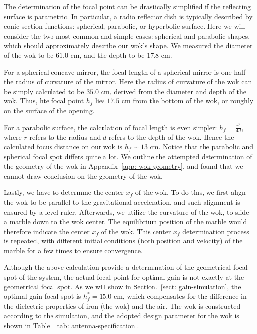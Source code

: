 \documentclass[12pt]{article}
\begin{document}
    The determination of the focal point can be drastically simplified if the reflecting surface is parametric. In particular, a radio reflector dish is typically described by conic section functions: spherical, parabolic, or hyperbolic surface. 
    Here we will consider the two most common and simple cases: spherical and parabolic shapes, which should approximately describe our wok's shape. We measured the diameter of the wok to be $61.0$ cm, and the depth to be $17.8$ cm.

    For a spherical concave mirror, the focal length of a spherical mirror is one-half the radius of curvature of the mirror. Here the radius of curvature of the wok can be simply calculated to be $35.0$ cm, derived from the diameter and depth of the wok. Thus, hte focal point $h_f$ lies $17.5$ cm from the bottom of the wok, or roughly on the surface of the opening.  

    For a parabolic surface, the calculation of focal length is even simpler: $h_{f} =\frac{r^2}{4d}$, where $r$ refers to the radius and $d$ refers to the depth of the wok.
    Hence the calculated focus distance on our wok is $h_f \sim 13$ cm. 
    Notice that the parabolic and spherical focal spot differs quite a lot.  
    We outline the attempted determination of the geometry of the wok in Appendix~\ref{app: wok-geometry}, and found that we cannot draw conclusion on the geometry of the wok. 

    Lastly, we have to determine the center $x_f$ of the wok. 
    To do this, we first align the wok to be parallel to the gravitational acceleration, 
    and such alignment is ensured by a level ruler.
    Afterwards, we utilize the curvature of the wok, to slide a marble down to the wok center.
    The equilibrium position of the marble would therefore indicate the center $x_f$ of the wok. 
    This center $x_f$ determination process is repeated, with different initial conditions (both position and velocity) of the marble for a few times to ensure convergence.

    Although the above calculation provide a determination of the geometrical focal spot of the system, the actual focal point for optimal gain is not exactly at the geometrical focal spot. 
    As we will show in Section.~\ref{sect: gain-simulation}, the optimal gain focal spot is $h_f^*  = 15.0$ cm, which compensates for the difference in the dielectric properties of iron (the wok) and the air. The wok is constructed according to the simulation, and the adopted design parameter for the wok is shown in Table.~\ref{tab: antenna-specification}.
\end{document}
